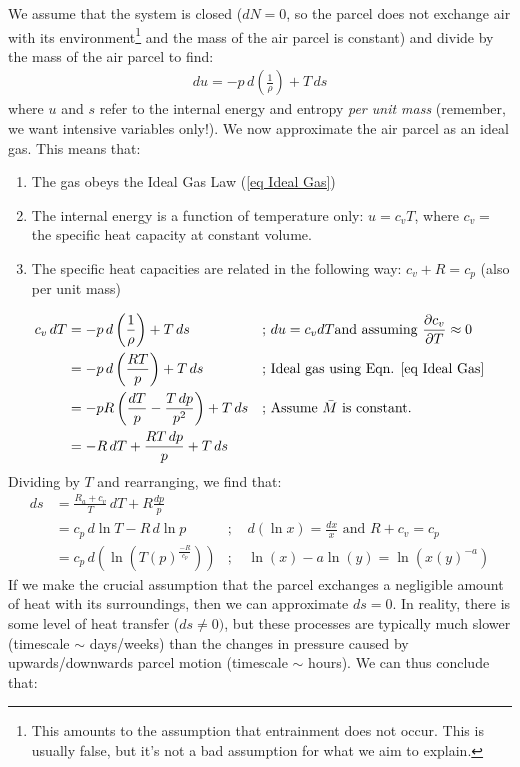 We assume that the system is closed (\(dN=0\), so the parcel does not exchange air with its environment\footnote{This amounts to the assumption that entrainment does not occur. This is usually false, but it's not a bad assumption for what we aim to explain.} and the mass of the air parcel is constant) and divide by the mass of the air parcel to find:
\begin{align*}
    du=-p\,d\left(\frac{1}{\rho}\right)+T\,ds
\end{align*}
where \(u\) and \(s\) refer to the internal energy and entropy \textit{per unit mass} (remember, we want intensive variables only!). We now approximate the air parcel as an ideal gas. This means that:

\begin{enumerate}
    \item The gas obeys the Ideal Gas Law (\ref{eq Ideal Gas})
    \item The internal energy is a function of temperature only: \(u=c_vT\), where \(c_v=\) the specific heat capacity at constant volume.
    \item The specific heat capacities are related in the following way: \(c_v+R=c_p\) (also per unit mass)
\end{enumerate}
\begin{align*}
    c_v\,dT&=-p\,d\left(\frac{1}{\rho}\right)+T\,ds
    &\text{; }&du=c_vdT \text{and assuming } \frac{\partial c_v}{\partial T}\approx0
    \\
    &=-p\,d\left(\frac{RT}{p}\right)+T\,ds
    &\text{; }&\text{Ideal gas using Eqn. \ref{eq Ideal Gas}}
    \\
    &=-pR\left(\frac{dT}{p}-\frac{T\,dp}{p^2}\right)+T\,ds
    &\text{; }&\text{Assume } \bar{M} \text{ is constant.}
    \\
    &=-R\,dT+\frac{RT\,dp}{p}+T\,ds
\end{align*}
Dividing by \(T\) and rearranging, we find that:
\begin{align*}
    ds & = \frac{R_a+c_v}{T}\,dT+R\frac{dp}{p}
    \\
     & = c_p\,d\ln T-R\,d\ln p
     &\text{; }& d(\ln x)=\frac{dx}{x}\text{ and } R+c_v=c_p
     \\
     & = c_p\,d\left(\ln \left(T(p)^\frac{-R}{c_p}\right)\right)
     &\text{; }&\ln(x)-a\ln(y)=\ln\left(x(y)^{-a}\right)
\end{align*}
If we make the crucial assumption that the parcel exchanges a negligible amount of heat with its surroundings, then we can approximate \(ds=0\). In reality, there is some level of heat transfer (\(ds\neq0)\), but these processes are typically much slower (timescale \(\sim\) days/weeks) than the changes in pressure caused by upwards/downwards parcel motion (timescale \(\sim\) hours). We can thus conclude that:
